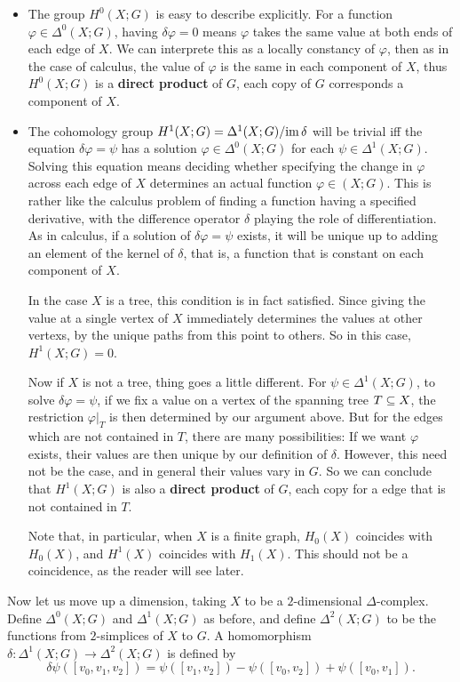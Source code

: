 \begin{itemize}
\item The group $H^0(X;G)$ is easy to describe explicitly. For a function $\varphi\in\Delta^0(X;G)$, having $\delta\varphi=0$ means $\varphi$ takes the same value at both ends of each edge of $X$. We can interprete this as a locally constancy of $\varphi$, then as in the case of calculus, the value of $\varphi$ is the same in each component of $X$, thus $H^0(X;G)$ is a \textbf{direct product} of $G$, each copy of $G$ corresponds a component of $X$.
\item The cohomology group $H^1(X;G)=\Delta^1(X;G)/\mathrm{im}\,\delta$ will be trivial iff the equation $\delta\varphi=\psi$ has a solution $\varphi\in\Delta^0(X;G)$ for each $\psi\in\Delta^1(X;G)$. Solving this equation means deciding whether specifying the change in $\varphi$ across each edge of $X$ determines
an actual function $\varphi\in(X;G)$. This is rather like the calculus problem of finding a function having a specified derivative, with the difference operator $\delta$ playing the role of differentiation. As in calculus, if a solution of $\delta\varphi=\psi$ exists, it will be unique up to adding an element of the kernel of $\delta$, that is, a function that is constant on each
component of $X$.\par
In the case $X$ is a tree, this condition is in fact satisfied. Since giving the value at a single vertex of $X$ immediately determines the values at other vertexs, by the unique paths from this point to others. So in this case, $H^1(X;G)=0$.\par
Now if $X$ is not a tree, thing goes a little different. For $\psi\in\Delta^1(X;G)$, to solve $\delta\varphi=\psi$, if we fix a value on a vertex of the spanning tree $T\subseteq X$, the restriction $\varphi|_T$ is then determined by our argument above. But for the edges which are not contained in $T$, there are many possibilities: If we want $\varphi$ exists, their values are then unique by our definition of $\delta$. However, this need not be the case, and in general their values vary in $G$. So we can conclude that $H^1(X;G)$ is also a \textbf{direct product} of $G$, each copy for a edge that is not contained in $T$.\par
Note that, in particular, when $X$ is a finite graph, $H_0(X)$ coincides with $H_0(X)$, and $H^1(X)$ coincides with $H_1(X)$. This should not be a coincidence, as the reader will see later.
\end{itemize}
\vspace{5mm}
Now let us move up a dimension, taking $X$ to be a $2$-dimensional $\Delta$-complex. Define $\Delta^0(X;G)$ and $\Delta^1(X;G)$ as before, and define $\Delta^2(X;G)$ to be the functions from $2$-simplices of $X$ to $G$. A homomorphism $\delta:\Delta^1(X;G)\to\Delta^2(X;G)$ is defined by \[\delta\psi([v_0,v_1,v_2])=\psi([v_1,v_2])-\psi([v_0,v_2])+\psi([v_0,v_1]).\]
